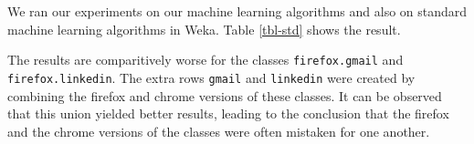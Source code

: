 We ran our experiments on our machine learning algorithms and also on
standard machine learning algorithms in Weka. Table \ref{tbl-std}
shows the result.

The results are comparitively worse for the classes {\tt firefox.gmail} and {\tt firefox.linkedin}.  The extra rows {\tt gmail}
and {\tt linkedin} were created by combining the firefox and chrome versions of these classes.   It can be observed that
this union yielded better results, leading to the conclusion that the firefox and the chrome versions of the classes were often mistaken for one another. 




